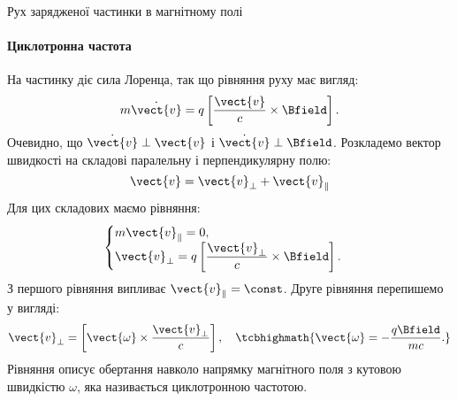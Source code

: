 \documentclass{beamer}
\begin{document}
\begin{frame}{Рух зарядженої частинки в магнітному полі}{}
\framesubtitle{Циклотронна частота}
	\begin{block}{}
		На частинку діє сила Лоренца, так що рівняння руху має вигляд:
		\begin{equation*}
			m\dot{\vect{v}} = q\left[\frac{\vect{v}}{c}\times\Bfield\right].
		\end{equation*}
		Очевидно, що $\dot{\vect{v}}\perp\vect{v}$ і $\dot{\vect{v}}\perp\Bfield$. Розкладемо вектор швидкості на
		складові паралельну і перпендикулярну полю:
		\begin{equation*}
			\vect{v} = \vect{v}_{\perp} + \vect{v}_{\parallel}
		\end{equation*}
		Для цих складових маємо рівняння:
		\begin{equation*}
			\begin{cases}
				m\vect{v}_{\parallel} = 0, \\
				\vect{v}_{\perp} = q\left[\dfrac{\vect{v}_{\perp}}{c}\times\Bfield\right].
			\end{cases}
		\end{equation*}
		З першого рівняння випливає $\vect{v}_{\parallel} = \const$.
Друге рівняння перепишемо у вигляді:
\begin{equation*}
    \vect{v}_{\perp} = \left[\vect{\omega}\times\dfrac{\vect{v}_{\perp}}{c}\right],\quad \tcbhighmath{\vect{\omega} = - \frac{q\Bfield}{mc}.}
\end{equation*}
Рівняння описує обертання навколо напрямку магнітного поля з кутовою швидкістю $\omega$, яка називається \alert{ циклотронною частотою}.
	\end{block}
\end{frame}
\end{document}
